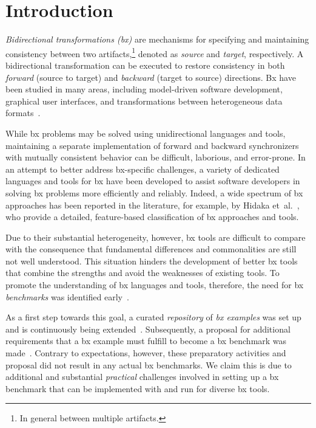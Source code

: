 \section{Introduction}
\label{sec:Introduction}
%

\emph{Bidirectional transformations (bx)} are mechanisms for specifying and maintaining consistency between two artifacts,\footnote{In general between multiple artifacts.} denoted as \emph{source} and \emph{target}, respectively. 
A bidirectional transformation can be executed to restore consistency in both \emph{forward} (source to target) and \emph{backward} (target to source) directions. 
Bx have been studied in many areas, including model-driven software development, graphical user interfaces, and transformations between heterogeneous data formats~\cite{ICMT2009-Czarnecki}.

While bx problems may be solved using unidirectional languages and tools, maintaining a separate implementation of forward and backward synchronizers with mutually consistent behavior can be difficult, laborious, and error-prone. 
In an attempt to better address bx-specific challenges, a variety of dedicated languages and tools for bx have been developed to assist software developers in solving bx problems more efficiently and reliably. 
Indeed, a wide spectrum of bx approaches has been reported in the literature, for example, by Hidaka et~al.~\cite{SOSYM-Hidaka2016}, who provide a detailed, feature-based classification of bx approaches and tools.

Due to their substantial heterogeneity, however, bx tools are difficult to compare with the consequence that fundamental differences and commonalities are still not well understood.
This situation hinders the development of better bx tools that combine the strengths and avoid the weaknesses of existing tools.
To promote the understanding of bx languages and tools, therefore, the need for bx \emph{benchmarks} was identified early~\cite{ICMT2009-Czarnecki}. 

As a first step towards this goal, a curated \emph{repository} of \emph{bx examples} was set up and is continuously being extended~\cite{Cheney2014}.
Subsequently, a proposal for additional requirements that a bx example must fulfill to become a bx benchmark was made~\cite{AnjorinCG0RS14}. 
%
Contrary to expectations, however, these preparatory activities and proposal did not result in any actual bx benchmarks.
We claim this is due to additional and substantial \emph{practical} challenges involved in setting up a bx benchmark that can be implemented with and run for  diverse bx tools.

